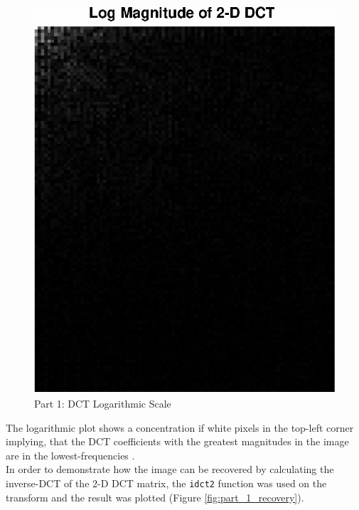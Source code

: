 \documentclass[conference]{IEEEtran}
\begin{document}
  \begin{figure}[H]
    \centering
    \includegraphics[scale=0.5]{./img/part_1_log_dct}
    \caption{Part 1: DCT Logarithmic Scale}
    \label{fig:part_1_log_dct}
  \end{figure}

  The logarithmic plot shows a concentration if white pixels in the top-left
  corner implying, that the DCT coefficients with the greatest magnitudes in the
  image are in the lowest-frequencies \cite{neural}.
  \\
  In order to demonstrate how the image can be recovered by calculating the inverse-DCT
  of the 2-D DCT matrix, the \texttt{idct2} function was used on the
  transform and the result was plotted (Figure \ref{fig:part_1_recovery}).
\end{document}

